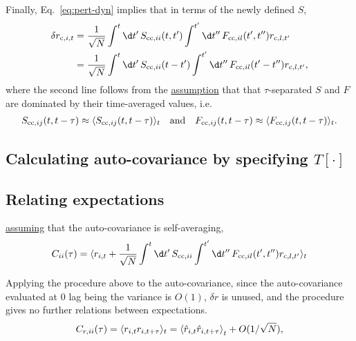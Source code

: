 \documentclass[11pt,openany,oneside]{article} %
\begin{document}
Finally, Eq.~\ref{eq:pert-dyn} implies that in terms of the newly defined $S$,
\begin{equation}
  \label{eq:pert-sol}
  \begin{aligned}
    \delta r_{\cula,i,t} &= \frac{1}{\sqrt{N}}\int^t\d t'\,S_{\cula\cula,ii}(t,t') \int^{t'}\d t''\,F_{\cula\cula,il}(t',t'') r_{\cula,l,t'}\\
  &= \frac{1}{\sqrt{N}}\int^t\d t'\,S_{\cula\cula,ii}(t-t') \int^{t'}\d t''\,F_{\cula\cula,il}(t'-t'') r_{\cula,l,t'},
  \end{aligned}
\end{equation}
where the second line follows from the \uline{assumption} that that $\tau$-separated $S$ and $F$ are
dominated by their time-averaged values, i.e.
\begin{align*}
  S_{\mathrm{c}\mathrm{c},ij}(t,t-\tau) \approx \langle S_{\mathrm{c}\mathrm{c},ij}(t,t-\tau)\rangle_t\quad\text{and}\quad F_{\mathrm{c}\mathrm{c},ij}(t,t-\tau) \approx \langle F_{\mathrm{c}\mathrm{c},ij}(t,t-\tau)\rangle_t.
\end{align*}

\subsection{Calculating auto-covariance by specifying $T[\cdot]$}


\subsection{Relating expectations}



\uline{assuming} that the auto-covariance is self-averaging,
\begin{equation}
  \label{eq:auto-cov}
  C_{ii}(\tau) = \lag r_{i,t}+\frac{1}{\sqrt{N}}\int^t\d t'\,S_{\cula\cula,ii} \int^{t'}\d t''\,F_{\cula\cula,il}(t',t'') r_{\cula,l,t'}\rag_t
\end{equation}


Applying the procedure above to the auto-covariance, since the auto-covariance evaluated at $0$ lag
being the variance is $O(1)$, $\delta r$ is unused, and the procedure gives no further relations
between expectations.
\begin{align*}
  C_{r,ii}(\tau) = \langle r_{i,t}r_{i,t+\tau}\rangle_t = {\langle \hat{r}_{i,t}\hat{r}_{i,t+\tau}\rangle}_t + O(1/\sqrt{N}),
\end{align*}

%  
% 
\end{document}
